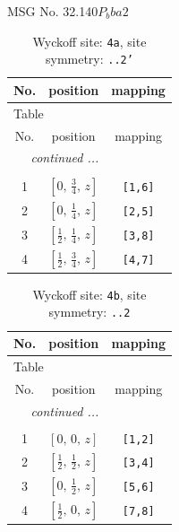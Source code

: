 \documentclass[fleqn,8pt]{jsarticle}
\begin{document}
\setcounter{MaxMatrixCols}{32}

\renewcommand{\tablename}{Table~}
\renewcommand{\figurename}{Figure~}
\begin{center}
\LARGE
MSG No. 32.140\quad$P_{b}ba2$
\end{center}
\renewcommand{\arraystretch}{1.2}
\begin{longtable}{ccc}
\caption{Wyckoff site: {\tt 4a}, site symmetry: {\tt ..2'}}
 \\
 \hline \hline
No. & position & mapping \\ \hline \endfirsthead

\multicolumn{2}{l}{\tablename\ \thetable{}} \\
 \hline \hline
No. & position & mapping \\ \hline \endhead

 \hline \hline
\multicolumn{2}{r}{\footnotesize\it continued ...} \\ \endfoot

 \hline \hline
\multicolumn{2}{r}{} \\ \endlastfoot

1 & $\left[ 0,\, \frac{3}{4},\, z \right]$ & {\tt [1,6]} \\ \hline
2 & $\left[ 0,\, \frac{1}{4},\, z \right]$ & {\tt [2,5]} \\ \hline
3 & $\left[ \frac{1}{2},\, \frac{1}{4},\, z \right]$ & {\tt [3,8]} \\ \hline
4 & $\left[ \frac{1}{2},\, \frac{3}{4},\, z \right]$ & {\tt [4,7]} \\
\end{longtable}
\renewcommand{\arraystretch}{1.2}
\begin{longtable}{ccc}
\caption{Wyckoff site: {\tt 4b}, site symmetry: {\tt ..2}}
 \\
 \hline \hline
No. & position & mapping \\ \hline \endfirsthead

\multicolumn{2}{l}{\tablename\ \thetable{}} \\
 \hline \hline
No. & position & mapping \\ \hline \endhead

 \hline \hline
\multicolumn{2}{r}{\footnotesize\it continued ...} \\ \endfoot

 \hline \hline
\multicolumn{2}{r}{} \\ \endlastfoot

1 & $\left[ 0,\, 0,\, z \right]$ & {\tt [1,2]} \\ \hline
2 & $\left[ \frac{1}{2},\, \frac{1}{2},\, z \right]$ & {\tt [3,4]} \\ \hline
3 & $\left[ 0,\, \frac{1}{2},\, z \right]$ & {\tt [5,6]} \\ \hline
4 & $\left[ \frac{1}{2},\, 0,\, z \right]$ & {\tt [7,8]} \\
\end{longtable}
\end{document}
